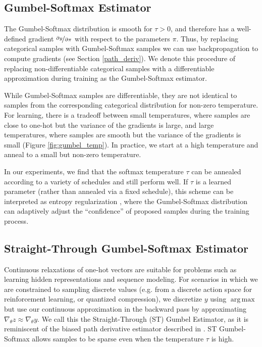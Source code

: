 \documentclass{article} %
\DeclareMathOperator*{\argmax}{arg\,max}
\begin{document}
\subsection{Gumbel-Softmax Estimator}

The Gumbel-Softmax distribution is smooth for $\tau > 0$, and therefore has a well-defined gradient $\nicefrac{\partial y}{\partial \pi}$ with respect to the parameters $\pi$. Thus, by replacing categorical samples with Gumbel-Softmax samples we can use backpropagation to compute gradients (see Section \ref{path_deriv}). We denote this procedure of replacing non-differentiable categorical samples with a differentiable approximation during training as the Gumbel-Softmax estimator.

While Gumbel-Softmax samples are differentiable, they are not identical to samples from the corresponding categorical distribution for non-zero temperature. 
For learning, there is a tradeoff between small temperatures, where samples are close to one-hot but the variance of the gradients is large, and large temperatures, where samples are smooth but the variance of the gradients is small (Figure \ref{fig:gumbel_temp}). In practice, we start at a high temperature and anneal to a small but non-zero temperature.

In our experiments, we find that the softmax temperature $\tau$ can be annealed according to a variety of schedules and still perform well. If $\tau$ is a learned parameter (rather than annealed via a fixed schedule), this scheme can be interpreted as entropy regularization \citep{szegedy2015rethinking,entropyreg}, where the Gumbel-Softmax distribution can adaptively adjust the ``confidence'' of proposed samples during the training process.

\subsection{Straight-Through Gumbel-Softmax Estimator}

Continuous relaxations of one-hot vectors are suitable for problems such as learning hidden representations and sequence modeling. For scenarios in which we are constrained to sampling discrete values (e.g. from a discrete action space for reinforcement learning, or quantized compression), we discretize $y$ using $\argmax$ but use our continuous approximation in the backward pass by approximating $\nabla_\theta z \approx \nabla_\theta y$. We call this the Straight-Through (ST) Gumbel Estimator, as it is reminiscent of the biased path derivative estimator described in \citet{DBLP:journals/corr/BengioLC13}. ST Gumbel-Softmax allows samples to be sparse even when the temperature $\tau$ is high.
\end{document}
